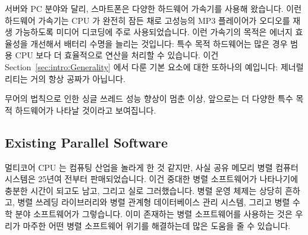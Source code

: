 서버와 PC 분야와 달리, 스마트폰은 다양한 하드웨어 가속기를 사용해 왔습니다.
이런 하드웨어 가속기는 CPU 가 완전히 잠든 채로 고성능의 MP3 플레이어가 오디오를
재생 가능하도록 미디어 디코딩에 주로 사용되었습니다.
이런 가속기의 목적은 에너지 효율성을 개선해서 배터리 수명을 늘리는 것입니다:
특수 목적 하드웨어는 많은 경우 범용 CPU 보다 더 효율적으로 연산을 처리할 수
있습니다.
이건 Section~\ref{sec:intro:Generality} 에서 다룬 기본 요소에 대한 또하나의
예입니다: 제너럴리티는 거의 항상 공짜가 아닙니다.

무어의 법칙으로 인한 싱글 쓰레드 성능 향상이 멈춘 이상, 앞으로는 더 다양한 특수
목적 하드웨어가 나타날 것이라고 보여집니다.

\iffalse
Unlike the server and PC arena, smartphones have long used a wide
variety of hardware accelerators.
These hardware accelerators are often used for media decoding,
so much so that a high-end MP3 player might be able to play audio
for several minutes---with its CPU fully powered off the entire time.
The purpose of these accelerators is to improve energy efficiency
and thus extend battery life: special purpose hardware can often
compute more efficiently than can a general-purpose CPU.
This is another example of the principle called out in
Section~\ref{sec:intro:Generality}: Generality is almost never free.

Nevertheless, given the end of Moore's-Law-induced single-threaded
performance increases, it seems safe to predict that there will
be an increasing variety of special-purpose hardware going forward.
\fi

\subsection{Existing Parallel Software}
\label{sec:cpu:Existing Parallel Software}

멀티코어 CPU 는 컴퓨팅 산업을 놀라게 한 것 같지만, 사실 공유 메모리 병렬 컴퓨터
시스템은 25년여 전부터 판매되었습니다.
이건 중대한 병렬 소프트웨어가 나타나기에 충분한 시간이 되고도 남고, 그리고 실로
그러했습니다.
병렬 운영 체제는 상당히 흔하고, 병렬 쓰레딩 라이브러리와 병렬 관계형
데이터베이스 관리 시스템, 그리고 병렬 수학 분야 소프트웨어가 그렇습니다.
이미 존재하는 병렬 소프트웨어를 사용하는 것은 우리가 마주한 어떤 병렬
소프트웨어 위기를 해결하는데 많은 도움을 줄 수 있습니다.

\iffalse
Although multicore CPUs seem to have taken the computing industry
by surprise, the fact remains that shared-memory parallel computer
systems have been commercially available for more than a quarter
century.
This is more than enough time for significant parallel software
to make its appearance, and it indeed has.
Parallel operating systems are quite commonplace, as are parallel
threading libraries, parallel relational database management systems, 
and parallel numerical software.
Use of existing parallel software can go a long ways towards solving any
parallel-software crisis we might encounter.
\fi

